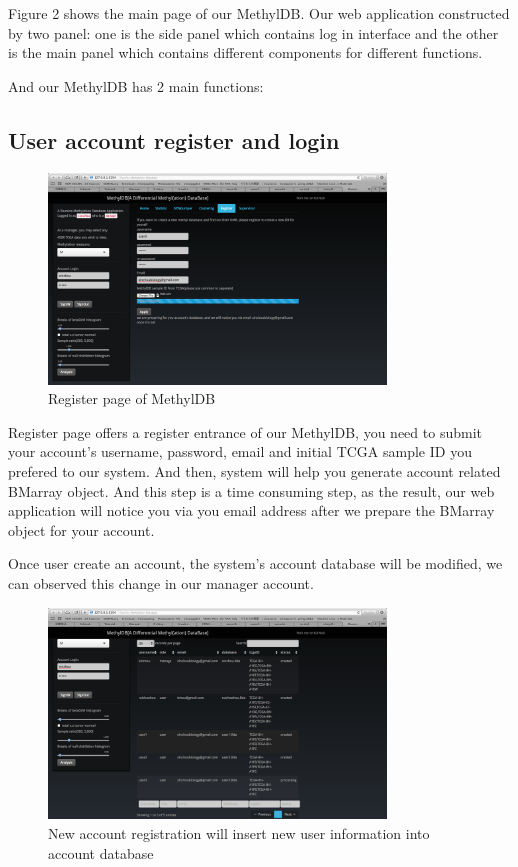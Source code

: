 \documentclass{article}\usepackage[]{graphicx}\usepackage[]{color}
\begin{document}
Figure 2 shows the main page of our MethylDB. Our web application constructed by two panel: one is the side panel which contains log in interface and the other is the main panel which contains different components for different functions.

And our MethylDB has 2 main functions:
\subsection{User account register and login}

\begin{figure}
\centering
\includegraphics[width=0.8\textwidth]{Register.png}
\caption{Register page of MethylDB}
\end{figure}

Register page offers a register entrance of our MethylDB, you need to submit your account's username, password, email and initial TCGA sample ID you prefered to our system. And then, system will help you generate account related BMarray object. And this step is a time consuming step, as the result, our web application will notice you via you email address after we prepare the BMarray object for your account. 

Once user create an account, the system's account database will be modified, we can observed this change in our manager account. 

\begin{figure}
\centering
\includegraphics[width=0.8\textwidth]{Supervisor.png}
\caption{New account registration will insert new user information into account database}
\end{figure}
\end{document}
